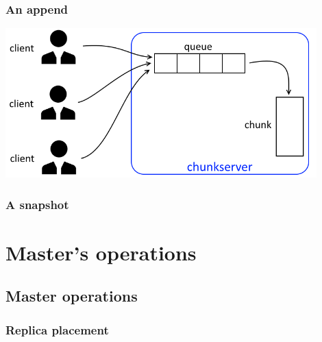 \documentclass{beamer}
\newcommand{\slidewidth}{12cm}
\begin{document}
%
\begin{frame}
 \frametitle{An append}
 \centering
 \includegraphics[width=\slidewidth]{figures/appendsschema.png}
\end{frame}

\begin{frame}
 \frametitle{A snapshot}
 
\end{frame}

\section{Master's operations}
\subsection{Master operations}
\begin{frame}
 \frametitle{Replica placement}
 
\end{frame}
\end{document}

